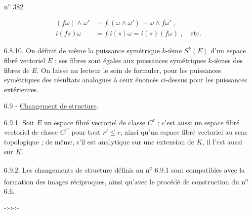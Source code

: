 \hfill n\textsuperscript{o} 382

\[
\begin{aligned}
(f\omega)\wedge\omega'&=f.(\omega\wedge\omega')=\omega\wedge f\omega'\;,\\
i(fs)\omega&=f.i(s)\omega=i(s)(f\omega)\;,\quad\text{etc.}
\end{aligned}
\]

6.8.10. On définit de même la \uline{puissance symétrique} $k$-\uline{ième} $S^k(E)$ d'un espace fibré vectoriel $E$ ; ses fibres sont égales aux puissances symétriques $k$-ièmes des fibres de $E$. On laisse au lecteur le soin de formuler, pour les puissances symétriques des résultats analogues à ceux énoncés ci-dessus pour les puissances extérieures.

6.9 - \uline{Changement de structure}.

6.9.1. Soit $E$ un espace fibré vectoriel de classe $C^r$ ; c'est aussi un espace fibré vectoriel de classe $C^{r'}$ pour tout $r'\leq r$, ainsi qu'un espace fibré vectoriel au sens topologique ; de même, s'il est analytique sur une extension de $K$, il l'est aussi sur $K$.

6.9.2. Les changements de structure définis au n\textsuperscript{o} 6.9.1 sont compatibles avec la formation des images réciproques, ainsi qu'avec le \hspace{3em}procédé de construction du n\textsuperscript{o} 6.6.

\begin{center}-:-:-:-\end{center}
